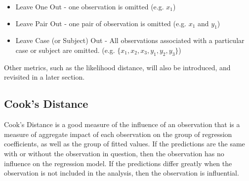 \documentclass[12pt, a4paper]{report}
\theoremstyle{plain}
\theoremstyle{definition}
\theoremstyle{remark}
\begin{document}
	\begin{itemize}
		\item Leave One Out - one observation is omitted (e.g. $x_1$)
		\item Leave Pair Out - one pair of observation  is omitted (e.g. $x_1$ and $y_1$)
		\item Leave Case (or Subject) Out - All observations associated with a particular case or subject are omitted. (e.g. $\{x_1,x_2,x_3,y_1,y_2,y_3\}$)
	\end{itemize}
	Other metrics, such as the likelihood distance, will also be introduced, and revisited in a later section.
	
	
	
	
	
	
	
	
	


	\subsection{Cook's Distance}
	
	Cook's Distance is a good measure of the influence of an observation that is a measure of aggregate impact of each observation on the group of regression coefficients, as well as the group of fitted values.
	If the predictions are the same with or without the observation in question, then the observation has no influence on the regression model. If the predictions differ greatly when the observation is not included in the analysis, then the observation is influential.
	
\end{document}
